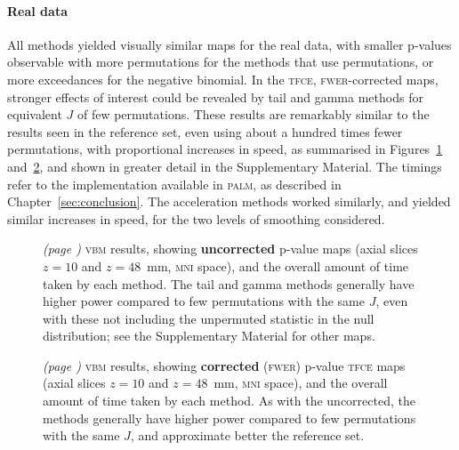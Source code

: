 \paragraph{Real data} All methods yielded visually similar maps for the real data, with smaller p-values observable with more permutations for the methods that use permutations, or more exceedances for the negative binomial. In the \textsc{tfce}, \textsc{fwer}-corrected maps, stronger effects of interest could be revealed by tail and gamma methods for equivalent $J$ of few permutations. These results are remarkably similar to the results seen in the reference set, even using about a hundred times fewer permutations, with proportional increases in speed, as summarised in Figures~\ref{fig:vbm-vox-uncp} and~\ref{fig:vbm-tfce-fwep}, and shown in greater detail in the Supplementary Material. The timings refer to the implementation available in \textsc{palm}, as described in Chapter~\ref{sec:conclusion}. The acceleration methods worked similarly, and yielded similar increases in speed, for the two levels of smoothing considered.

\begin{figure}[!b]
\centering
\caption[Uncorrected \textsc{vbm} results, showing the overall amount of time taken by each method.]{\emph{(page \pageref{fig:vbm-vox-uncp_noref})} \textsc{vbm} results, showing \textbf{uncorrected} p-value maps (axial slices $z=10$ and $z=48$~mm, \textsc{mni} space), and the overall amount of time taken by each method. The tail and gamma methods generally have higher power compared to few permutations with the same $J$, even with these not including the unpermuted statistic in the null distribution; see the Supplementary Material for other maps.}
\label{fig:vbm-vox-uncp}
\end{figure}

\begin{figure}[!b]
\centering
\caption[Corrected \textsc{vbm} results, showing the overall amount of time taken by each method.]{\emph{(page \pageref{fig:vbm-tfce-fwep_noref})} \textsc{vbm} results, showing \textbf{corrected} (\textsc{fwer}) p-value \textsc{tfce} maps (axial slices $z=10$ and $z=48$~mm, \textsc{mni} space), and the overall amount of time taken by each method. As with the uncorrected, the methods generally have higher power compared to few permutations with the same $J$, and approximate better the reference set.}
\label{fig:vbm-tfce-fwep}
\end{figure}

